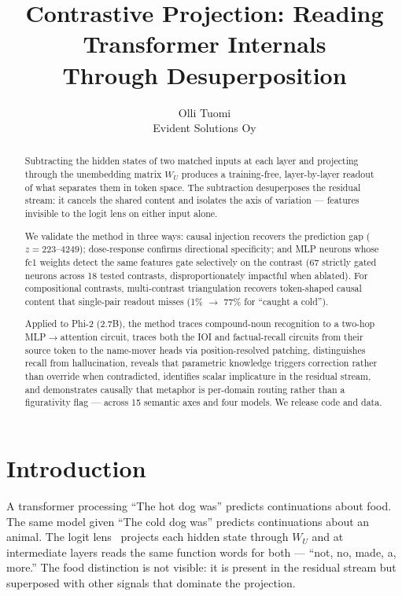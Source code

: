 \documentclass[11pt]{article}
\title{Contrastive Projection: Reading Transformer Internals\\ Through Desuperposition}
\author{Olli Tuomi\\ Evident Solutions Oy}
\date{}
\newcommand{\WU}{W_U}
\begin{document}
\maketitle

\begin{abstract}
Subtracting the hidden states of two matched inputs at each layer and
projecting through the unembedding matrix $\WU$ produces a training-free,
layer-by-layer readout of what separates them in token space. The
subtraction desuperposes the residual stream: it cancels the shared content
and isolates the axis of variation --- features invisible to the
logit lens on either input alone.

We validate the method in three ways: causal injection recovers the
prediction gap ($z = 223$--$4249$); dose-response confirms directional
specificity; and MLP neurons whose fc1 weights detect the same features
gate selectively on the contrast (67 strictly gated neurons across 18
tested contrasts, disproportionately impactful when ablated). For
compositional contrasts, multi-contrast triangulation recovers token-shaped
causal content that single-pair readout misses (1\% $\rightarrow$ 77\% for ``caught a
cold'').

Applied to Phi-2 (2.7B), the method traces compound-noun recognition to a
two-hop MLP$\rightarrow$attention circuit, traces both the IOI and factual-recall circuits
from their source token to the name-mover heads via position-resolved patching,
distinguishes recall from hallucination, reveals
that parametric knowledge triggers correction rather than override when
contradicted, identifies scalar implicature in the residual stream, and
demonstrates causally that metaphor is per-domain routing rather than a
figurativity flag --- across 15 semantic axes and four models. We release
code and data.
\end{abstract}

\section{Introduction}

A transformer processing ``The hot dog was'' predicts continuations about food.
The same model given ``The cold dog was'' predicts continuations about an
animal. The logit lens~\citep{nostalgebraist2020} projects each hidden state through
$\WU$ and at intermediate layers reads the same function words for both ---
``not, no, made, a, more.'' The food distinction is not visible: it is present in
the residual stream but superposed with other signals that dominate the
projection.
\end{document}
